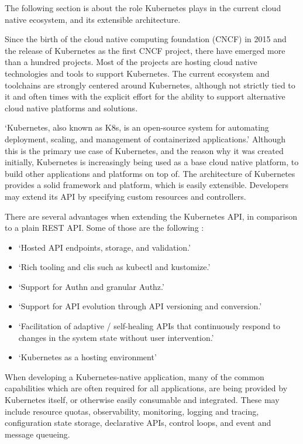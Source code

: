 The following section is about
the role Kubernetes plays in the current cloud native ecosystem,
and its extensible architecture.

Since the birth of the cloud native computing foundation (CNCF) in 2015 and the release of Kubernetes as the first CNCF project,
there have emerged more than a hundred projects.
Most of the projects are hosting cloud native technologies and tools to support Kubernetes.
The current ecosystem and toolchains are strongly centered around Kubernetes,
although not strictly tied to it and often times with the explicit effort
for the ability to support alternative cloud native platforms and solutions.

\enquote*{Kubernetes, also known as K8s, is an open-source system for automating deployment, scaling, and management of containerized applications.}
\autocite{kubernetesIoWebsite}
Although this is the primary use case of Kubernetes,
and the reason why it was created initially,
Kubernetes is increasingly being used as a base cloud native platform,
to build other applications and platforms on top of.
The architecture of Kubernetes provides a solid framework and platform,
which is easily extensible.
Developers may extend its API by specifying custom resources and controllers.

There are several advantages when extending the Kubernetes API,
in comparison to a plain REST API.
Some of those are the following
\autocite{kubebuilderBookWebsite}:

\begin{itemize}
	\item \enquote*{Hosted API endpoints, storage, and validation.}
	\item \enquote*{Rich tooling and clis such as kubectl and kustomize.}
	\item \enquote*{Support for Authn and granular Authz.}
	\item \enquote*{Support for API evolution through API versioning and conversion.}
	\item \enquote*{Facilitation of adaptive / self-healing APIs that continuously respond to changes in the system state without user intervention.}
	\item \enquote*{Kubernetes as a hosting environment}
	\autocite{kubebuilderBookWebsite}
\end{itemize}

When developing a Kubernetes-native application,
many of the common capabilities which are often required for all applications,
are being provided by Kubernetes itself, or otherwise easily consumable and integrated.
These may include resource quotas, observability, monitoring, logging and tracing,
configuration state storage, declarative APIs, control loops, and event and message queueing.

